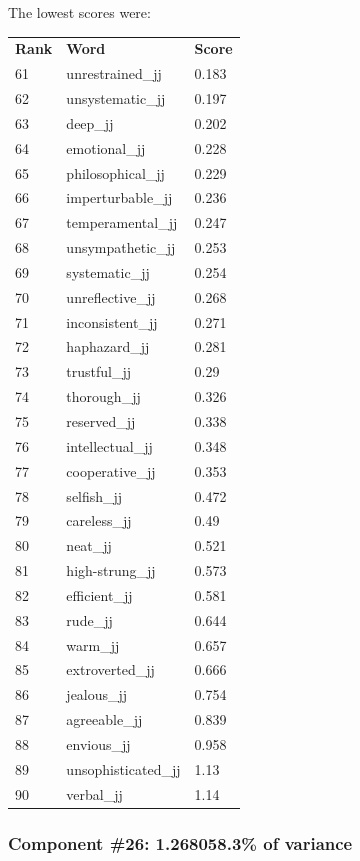 \documentclass[10pt,letterpaper]{book}
\begin{document}
The lowest scores were:
\begin{tabular}{ l l l }
        \textbf{Rank} & \textbf{Word} & \textbf{Score} \\
        61 & unrestrained\_jj & 0.183 \\
        62 & unsystematic\_jj & 0.197 \\
        63 & deep\_jj & 0.202 \\
        64 & emotional\_jj & 0.228 \\
        65 & philosophical\_jj & 0.229 \\
        66 & imperturbable\_jj & 0.236 \\
        67 & temperamental\_jj & 0.247 \\
        68 & unsympathetic\_jj & 0.253 \\
        69 & systematic\_jj & 0.254 \\
        70 & unreflective\_jj & 0.268 \\
        71 & inconsistent\_jj & 0.271 \\
        72 & haphazard\_jj & 0.281 \\
        73 & trustful\_jj & 0.29 \\
        74 & thorough\_jj & 0.326 \\
        75 & reserved\_jj & 0.338 \\
        76 & intellectual\_jj & 0.348 \\
        77 & cooperative\_jj & 0.353 \\
        78 & selfish\_jj & 0.472 \\
        79 & careless\_jj & 0.49 \\
        80 & neat\_jj & 0.521 \\
        81 & high-strung\_jj & 0.573 \\
        82 & efficient\_jj & 0.581 \\
        83 & rude\_jj & 0.644 \\
        84 & warm\_jj & 0.657 \\
        85 & extroverted\_jj & 0.666 \\
        86 & jealous\_jj & 0.754 \\
        87 & agreeable\_jj & 0.839 \\
        88 & envious\_jj & 0.958 \\
        89 & unsophisticated\_jj & 1.13 \\
        90 & verbal\_jj & 1.14 \\
\end{tabular}
\subsubsection{Component \#26: 1.268058.3\% of variance}
\end{document}
